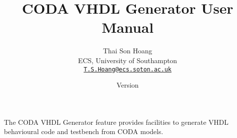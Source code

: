 \documentclass[a4paper,10pt]{article}
\title{CODA VHDL Generator User Manual}
\author{%
  Thai Son Hoang\\%
  ECS, University of Southampton\\%
  \texttt{\href{mailto:T.S.Hoang@ecs.soton.ac.uk}{T.S.Hoang@ecs.soton.ac.uk}}%
}%
\date{%
  Version \VHDLManualVersion\\%
  \ifplastex
  \VHDLManualDate
  \else
  \displaydate{VHDLManualDate}%
  \fi
}
\begin{document}
\ifplastex%
\maketitle%
\else%
 \ifstandalone%
 \maketitle %
 \else%
 \fi%
\fi%

The CODA VHDL Generator feature provides facilities to generate VHDL behavioural code and testbench from CODA models. 












\end{document}
